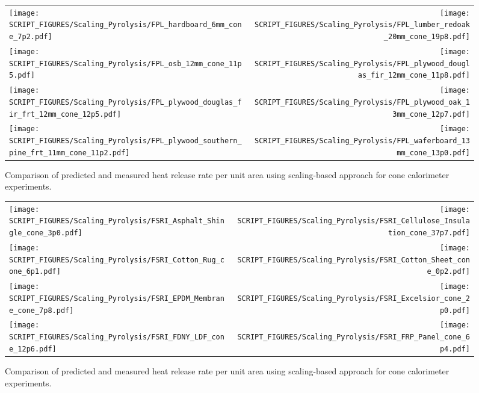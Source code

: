 \begin{figure}[p]
\begin{tabular*}{\textwidth}{l@{\extracolsep{\fill}}r}
\texttt{[image: SCRIPT\_FIGURES/Scaling\_Pyrolysis/FPL\_hardboard\_6mm\_cone\_7p2.pdf]} &
\texttt{[image: SCRIPT\_FIGURES/Scaling\_Pyrolysis/FPL\_lumber\_redoak\_20mm\_cone\_19p8.pdf]} \\
\texttt{[image: SCRIPT\_FIGURES/Scaling\_Pyrolysis/FPL\_osb\_12mm\_cone\_11p5.pdf]} &
\texttt{[image: SCRIPT\_FIGURES/Scaling\_Pyrolysis/FPL\_plywood\_douglas\_fir\_12mm\_cone\_11p8.pdf]} \\
\texttt{[image: SCRIPT\_FIGURES/Scaling\_Pyrolysis/FPL\_plywood\_douglas\_fir\_frt\_12mm\_cone\_12p5.pdf]} &
\texttt{[image: SCRIPT\_FIGURES/Scaling\_Pyrolysis/FPL\_plywood\_oak\_13mm\_cone\_12p7.pdf]} \\
\texttt{[image: SCRIPT\_FIGURES/Scaling\_Pyrolysis/FPL\_plywood\_southern\_pine\_frt\_11mm\_cone\_11p2.pdf]} &
\texttt{[image: SCRIPT\_FIGURES/Scaling\_Pyrolysis/FPL\_waferboard\_13mm\_cone\_13p0.pdf]} \\
\end{tabular*}
\caption[HRRPUA of FPL Materials using scaling model ]
{Comparison of predicted and measured heat release rate per unit area using scaling-based approach for cone calorimeter experiments.}
\label{FPL_Materials_HRR_Wood-Based}
\end{figure}

\begin{figure}[p]
\begin{tabular*}{\textwidth}{l@{\extracolsep{\fill}}r}
\texttt{[image: SCRIPT\_FIGURES/Scaling\_Pyrolysis/FSRI\_Asphalt\_Shingle\_cone\_3p0.pdf]} &
\texttt{[image: SCRIPT\_FIGURES/Scaling\_Pyrolysis/FSRI\_Cellulose\_Insulation\_cone\_37p7.pdf]} \\
\texttt{[image: SCRIPT\_FIGURES/Scaling\_Pyrolysis/FSRI\_Cotton\_Rug\_cone\_6p1.pdf]} &
\texttt{[image: SCRIPT\_FIGURES/Scaling\_Pyrolysis/FSRI\_Cotton\_Sheet\_cone\_0p2.pdf]} \\
\texttt{[image: SCRIPT\_FIGURES/Scaling\_Pyrolysis/FSRI\_EPDM\_Membrane\_cone\_7p8.pdf]} &
\texttt{[image: SCRIPT\_FIGURES/Scaling\_Pyrolysis/FSRI\_Excelsior\_cone\_2p0.pdf]} \\
\texttt{[image: SCRIPT\_FIGURES/Scaling\_Pyrolysis/FSRI\_FDNY\_LDF\_cone\_12p6.pdf]} &
\texttt{[image: SCRIPT\_FIGURES/Scaling\_Pyrolysis/FSRI\_FRP\_Panel\_cone\_6p4.pdf]} \\
\end{tabular*}
\caption[HRRPUA of FSRI Materials using scaling model , Others materials]
{Comparison of predicted and measured heat release rate per unit area using scaling-based approach for cone calorimeter experiments.}
\label{FSRI_Materials_HRR_Others}
\end{figure}

